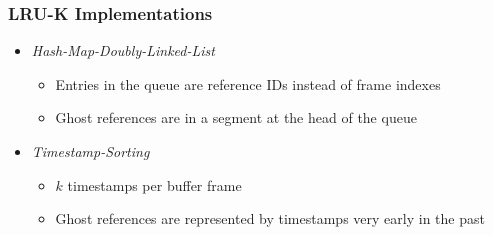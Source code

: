 
\begin{frame}
    \frametitle{LRU-K Implementations}

    \begin{itemize}
        \item<2->   \emph{Hash-Map-Doubly-Linked-List}
                    \begin{itemize}
                        \item<3->   Entries in the queue are reference IDs instead of frame indexes
                        \item<4->   Ghost references are in a segment at the head of the queue
                    \end{itemize}
        \item<6->   \emph{Timestamp-Sorting}
                    \begin{itemize}
                        \item<7->   $k$ timestamps per buffer frame
                        \item<8->   Ghost references are represented by timestamps very early in the past
                    \end{itemize}
    \end{itemize}
\end{frame}








